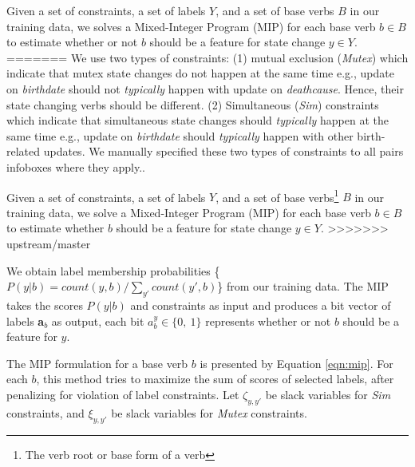Given a set of constraints, a set of labels $Y$, and a set of base verbs $B$ in our training data, we solves a Mixed-Integer Program (MIP) for each base verb $b \in B$ to estimate whether or not $b$ should be a feature for state change $y \in Y$. 
=======
We use two types of constraints:  (1) mutual exclusion (\textit{Mutex}) which indicate that mutex state changes do not happen at the same time 
e.g., update on \textit{birthdate} should not \textit{typically} happen with update on \textit{deathcause}. Hence,  their state changing verbs should be different. %
(2) Simultaneous (\textit{Sim}) constraints which indicate that simultaneous state changes should \textit{typically} happen at the same time e.g., update on \textit{birthdate} should \textit{typically} happen with other birth-related updates. %
We manually specified these two types  of  constraints to all pairs infoboxes where they apply.. 

Given a set of constraints, a set of labels $Y$, and a set of base verbs\footnote{The verb root or base form of a verb} $B$ in our training data, we solve a Mixed-Integer Program (MIP) for each base verb $b \in B$ to estimate whether $b$ should be a feature for state change $y \in Y$. 
>>>>>>> upstream/master

We obtain label membership probabilities \{$P(y | b) = count(y, b) / \sum_{y'} count(y', b) $\} from our training data. The MIP takes the scores $P(y | b)$ and constraints as input and produces a bit vector of labels \textbf{a}$_{b}$ as output, each bit  $a_{b}^{y} \in \{0,\ 1\}$ represents whether or not $b$ should be a feature for $y$.

The MIP formulation for a base verb $b$ is presented by Equation \ref{eqn:mip}. For each $b$, this method tries to maximize the sum of scores of selected labels, after penalizing for violation of label constraints. Let $\zeta_{y, y'}$ be slack variables for \textit{Sim} constraints, and $\xi_{y, y'}$ be slack variables for \textit{Mutex} constraints. 


